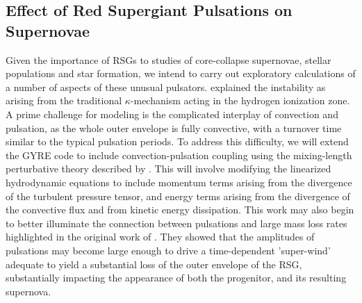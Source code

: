 \subsection{Effect of Red Supergiant Pulsations on Supernovae}

Given the importance of RSGs to studies of core-collapse supernovae, stellar populations and star formation, we intend to carry out exploratory calculations of a number of aspects of these unusual pulsators. 
\citet{1997AampA...327..224H}  explained the instability  as arising from the traditional $\kappa$-mechanism acting in the hydrogen ionization zone. A prime challenge for  modeling is the complicated interplay of convection and pulsation, as the whole outer envelope is fully convective, with a turnover time similar to the typical pulsation periods.   To address this difficulty, we will extend the GYRE code to include convection-pulsation coupling using the mixing-length perturbative theory described by \citet{Grigahcene:2005}. This will involve modifying the linearized hydrodynamic equations to include momentum terms arising from the divergence of the turbulent pressure tensor, and energy terms arising from the divergence of the convective flux and from kinetic energy dissipation. This work may also begin to better illuminate the connection between pulsations and large mass loss rates highlighted in the original work of \citet{Yoon_2010}. They showed that the amplitudes of pulsations may become large enough to drive a time-dependent 'super-wind' adequate to yield a substantial loss of the outer envelope of the RSG, substantially impacting the appearance of both the progenitor, and its resulting supernova.


